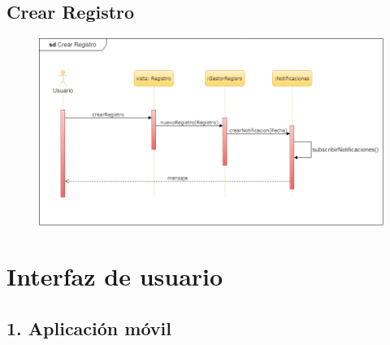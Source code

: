 		\subsection{Crear Registro}
			\begin{figure}[H]
        \centering
        \includegraphics[width=1\textwidth]{imagenes/DiagramasUML/sdCrearRegistro.png}
					\label{fig:diagrama-secuencia-crear-tienda}
			\end{figure}


	\section{Interfaz de usuario}
			\subsection{1. Aplicación móvil}

